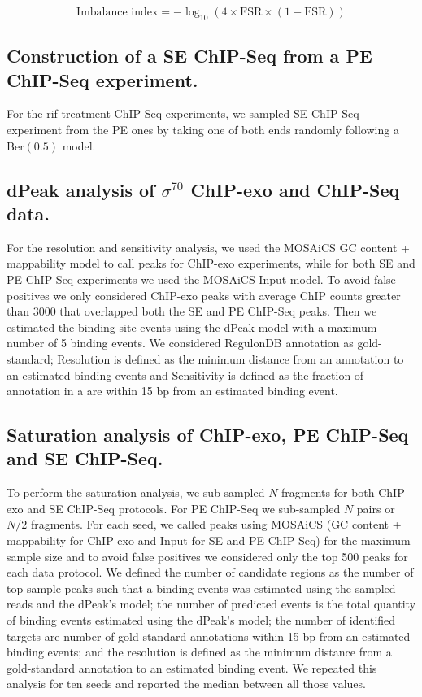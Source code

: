 \documentclass{bmcart}\usepackage[]{graphicx}\usepackage[]{color}
\newcommand{\sig}{\sigma^{70}}
\begin{document}
\[
\mbox{Imbalance index} = -\log_{10} (4 \times \mbox{FSR} \times (1 - \mbox{FSR}))
\]

\subsection*{Construction of a SE ChIP-Seq from a PE ChIP-Seq experiment.}

For the rif-treatment ChIP-Seq experiments, we sampled SE ChIP-Seq
experiment from the PE ones by taking one of both ends randomly
following a $\mbox{Ber}(0.5)$ model. 

\subsection*{dPeak analysis of $\sig$ ChIP-exo and ChIP-Seq data.}

For the resolution and sensitivity analysis, we used the MOSAiCS GC
content + mappability model to call peaks for ChIP-exo experiments,
while for both SE and PE ChIP-Seq experiments we used the MOSAiCS
Input model. To avoid false positives we only considered ChIP-exo
peaks with average ChIP counts greater than 3000 that overlapped both
the SE and PE ChIP-Seq peaks. Then we estimated the binding site
events using the dPeak model with a maximum number of 5 binding
events. We considered RegulonDB annotation as gold-standard;
Resolution is defined as the minimum distance from an annotation to an
estimated binding events and Sensitivity is defined as the fraction of
annotation in a are within 15 bp from an estimated binding event.

\subsection*{Saturation analysis of ChIP-exo, PE ChIP-Seq and SE ChIP-Seq.}

To perform the saturation analysis, we sub-sampled $N$ fragments for
both ChIP-exo and SE ChIP-Seq protocols. For PE ChIP-Seq we
sub-sampled $N$ pairs or $N/2$ fragments. For each seed, we called
peaks using MOSAiCS \cite{mosaics} (GC content + mappability for
ChIP-exo and Input for SE and PE ChIP-Seq) for the maximum sample size
and to avoid false positives we considered only the top 500 peaks for
each data protocol. We defined the number of candidate regions as the
number of top sample peaks such that a binding events was estimated
using the sampled reads and the dPeak's model; the number of predicted
events is the total quantity of binding events estimated using the
dPeak's model; the number of identified targets are number of
gold-standard annotations within 15 bp from an estimated binding
events; and the resolution is defined as the minimum distance from a
gold-standard annotation to an estimated binding event. We repeated
this analysis for ten seeds and reported the median between all those
values.
\end{document}
